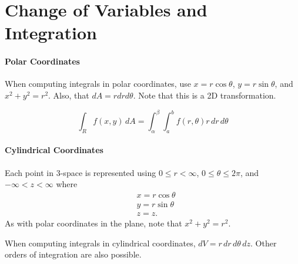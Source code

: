 \documentclass[12pt, a4paper]{article}
\theoremstyle{plain}
\theoremstyle{definition}
\theoremstyle{remark}
\begin{document}
\newpage
\part{Change of Variables and Integration}

\subsection{Polar Coordinates}

When computing integrals in polar coordinates, use $x=r\cos \theta$, $y=r\sin\theta$, and $x^2+y^2=r^2$. Also, that $dA = r dr d\theta$. Note that this is a 2D transformation.

$$ \int_R f(x, y) \, dA = \int_{\alpha}^{\beta} \int_a^b f(r, \theta) r \, dr \, d\theta$$



\subsection{Cylindrical Coordinates}

Each point in 3-space is represented using $0 \le r < \infty$, $0 \le \theta \le 2\pi$, and $-\infty < z < \infty$ where 
\begin{align*}
&x = r \cos \theta \\
&y = r \sin \theta \\
&z = z.
\end{align*}
As with polar coordinates in the plane, note that $x^2+y^2 = r^2$.

When computing integrals in cylindrical coordinates, $dV = r \, dr \, d\theta \, dz$. Other orders of integration are also possible.

\begin{center}
\end{center}
\end{document}
